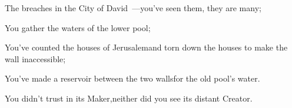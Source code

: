 
\begin{inparaenum}

  \pa{} The breaches in the City of David~---\pa{}you've seen them, they are many;%

  \pb{}You gather the waters of the lower pool;%

  \pa{} You've counted the houses of Jerusalem\pa{}and torn down the houses to make the wall inaccessible;%

  \pa{} You've made a reservoir between the two walls\pa{}for the old pool's water.%

  \pb{}You didn't trust in its Maker,\pa{}neither did you see its distant Creator.%

\end{inparaenum}
